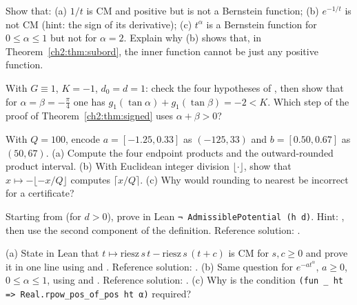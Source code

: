 \begin{exercise}[CM or Bernstein?]
Show that: (a) $1/t$ is CM and positive but is not a Bernstein function; (b) $e^{-1/t}$ is not CM (hint:
the sign of its derivative); (c) $t^\alpha$ is a Bernstein function for $0\le\alpha\le1$ but not for $\alpha=2$. Explain
why (b) shows that, in Theorem~\ref{ch2:thm:subord}, the inner function cannot be just any
positive function.
\end{exercise}

\begin{exercise}\label{ch2:ex:signed}
With $G\equiv1$, $K=-1$, $d_0=d=1$: check the four hypotheses of , then show that for
$\alpha=\beta=-\frac\pi4$ one has $g_1(\tan\alpha)+g_1(\tan\beta)=-2<K$. Which step of the proof of
Theorem~\ref{ch2:thm:signed} uses $\alpha+\beta>0$?
\end{exercise}

\begin{exercise}
With $Q=100$, encode $a=[-1.25, 0.33]$ as $(-125,33)$ and $b=[0.50, 0.67]$ as $(50,67)$. (a) Compute the four
endpoint products and the outward-rounded product interval. (b) With Euclidean integer division
$\lfloor\cdot\rfloor$, show that $x\mapsto-\lfloor -x/Q\rfloor$ computes $\lceil x/Q\rceil$. (c) Why would rounding
to nearest be incorrect for a certificate?
\end{exercise}

\begin{exercise}\sloppy
Starting from  (for $d>0$), prove in Lean \lstinline[style=chdeux]!¬ AdmissiblePotential (h d)!.
Hint: , then use the second component  of the definition. Reference solution:\newline
{} \tierA.
\end{exercise}

\begin{exercise}
(a) State in Lean that $t\mapsto\mathrm{riesz}\,s\,t-\mathrm{riesz}\,s\,(t+c)$ is CM for $s,c\ge0$ and prove it in
one line using  and . Reference solution:
 \tierA. (b) Same question for $e^{-at^\alpha}$, $a\ge0$, $0\le\alpha\le1$, using
 and . Reference solution:  \tierA.
(c) Why is the condition \lstinline[style=chdeux]!(fun _ ht => Real.rpow_pos_of_pos ht α)! required?
\end{exercise}

